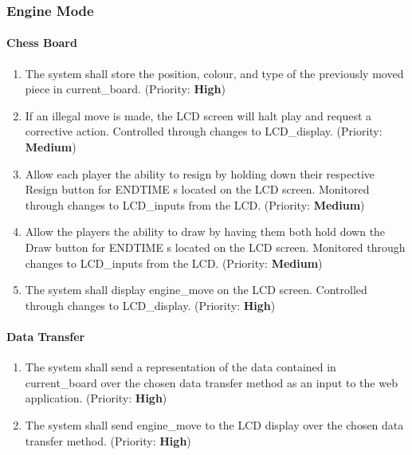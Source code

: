 \documentclass[12pt]{article}
\begin{document}
\subsubsection{Engine Mode}
\paragraph{Chess Board}
\begin{enumerate}[{EB}1., leftmargin=2\parindent]
    \item The system shall store the position, colour, and type of the previously moved piece in current\_board. (Priority: \textbf{High}) 
    \item If an illegal move is made, the LCD screen will halt play and request a corrective action. Controlled through changes to LCD\_display. (Priority: \textbf{Medium}) 
    \item Allow each player the ability to resign by holding down their respective Resign button for ENDTIME \si{\second} located on the LCD screen. Monitored through changes to LCD\_inputs from the LCD. (Priority: \textbf{Medium}) 
    \item Allow the players the ability to draw by having them both hold down the Draw button for ENDTIME \si{\second} located on the LCD screen. Monitored through changes to LCD\_inputs from the LCD. (Priority: \textbf{Medium}) 
    \item The system shall display engine\_move on the LCD screen. Controlled through changes to LCD\_display. (Priority: \textbf{High}) 
\end{enumerate}

\paragraph{Data Transfer}
\begin{enumerate}[{ED}1., leftmargin=2\parindent]
    \item The system shall send a representation of the data contained in current\_board over the chosen data transfer method as an input to the web application. (Priority: \textbf{High}) 
    \item The system shall send engine\_move to the LCD display over the chosen data transfer method. (Priority: \textbf{High}) 
\end{enumerate}
\end{document}
